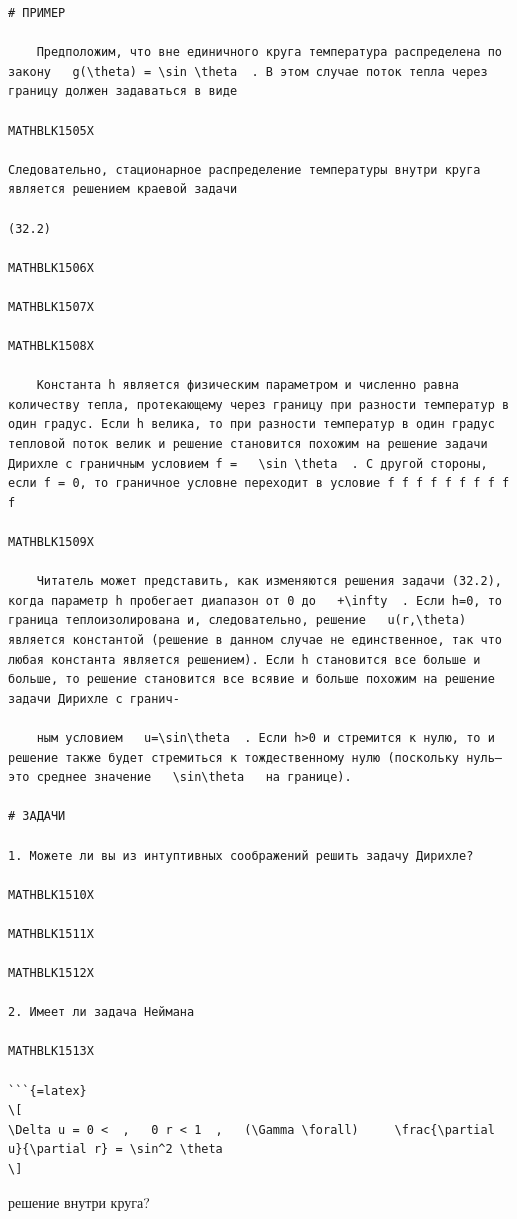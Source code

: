 \documentclass[
]{article}
\begin{document}
\begin{verbatim}
# ПРИМЕР

    Предположим, что вне единичного круга температура распределена по закону   g(\theta) = \sin \theta  . В этом случае поток тепла через границу должен задаваться в виде

MATHBLK1505X

Следовательно, стационарное распределение температуры внутри круга является решением краевой задачи

(32.2)

MATHBLK1506X

MATHBLK1507X

MATHBLK1508X

    Константа h является физическим параметром и численно равна количеству тепла, протекающему через границу при разности температур в один градус. Если h велика, то при разности температур в один градус тепловой поток велик и решение становится похожим на решение задачи Дирихле с граничным условием f =   \sin \theta  . С другой стороны, если f = 0, то граничное условне переходит в условие f f f f f f f f f f

MATHBLK1509X

    Читатель может представить, как изменяются решения задачи (32.2), когда параметр h пробегает диапазон от 0 до   +\infty  . Если h=0, то граница теплоизолирована и, следовательно, решение   u(r,\theta)   является константой (решение в данном случае не единственное, так что любая константа является решением). Если h становится все больше и больше, то решение становится все всявие и больше похожим на решение задачи Дирихле с гранич-

    ным условием   u=\sin\theta  . Если h>0 и стремится к нулю, то и решение также будет стремиться к тождественному нулю (поскольку нуль—это среднее значение   \sin\theta   на границе).

# ЗАДАЧИ

1. Можете ли вы из интуптивных соображений решить задачу Дирихле?

MATHBLK1510X

MATHBLK1511X

MATHBLK1512X

2. Имеет ли задача Неймана

MATHBLK1513X

```{=latex}
\[
\Delta u = 0 <  ,   0 r < 1  ,   (\Gamma \forall)     \frac{\partial u}{\partial r} = \sin^2 \theta
\]
\end{verbatim}

решение внутри круга?
\end{document}
